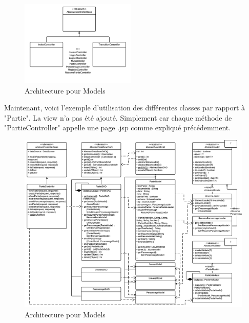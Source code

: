 \documentclass[a4paper,oneside,10pt]{article}
\begin{document}
\begin{figure}[H]
	\begin{center}
		\includegraphics[width=0.49\textwidth]{images/logiciel/arch4.png}  
		\caption{Architecture pour Models}
	\end{center}
\end{figure}

Maintenant, voici l'exemple d'utilisation des différentes classes par rapport à "Partie". 
La view n'a pas été ajouté. Simplement car chaque méthode de "PartieController" appelle une page .jsp comme expliqué précédemment. 


\begin{figure}[H]
	\begin{center}
		\includegraphics[width=\textwidth]{images/logiciel/partieexemple.png}  
		\caption{Architecture pour Models}
	\end{center}
\end{figure}
\end{document}
